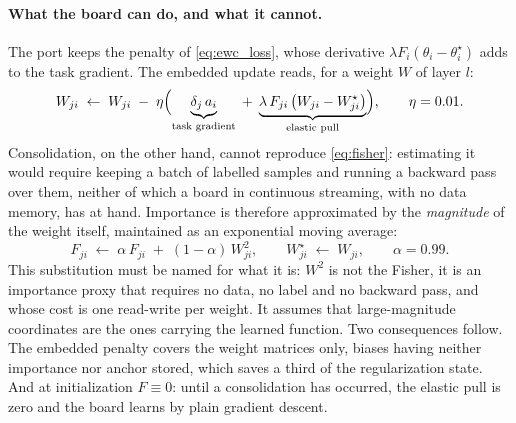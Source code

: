 \paragraph{What the board can do, and what it cannot.} The port keeps the penalty of
\eqref{eq:ewc_loss}, whose derivative $\lambda F_i (\theta_i - \theta^\star_i)$ adds to the task
gradient. The embedded update reads, for a weight $W$ of layer $l$:
\begin{equation}
\label{eq:board_sgd}
W_{ji} \;\leftarrow\; W_{ji} \;-\; \eta \Bigl(
\underbrace{\delta_j \, a_i}_{\text{task gradient}}
\;+\; \underbrace{\lambda \, F_{ji} \,\bigl(W_{ji} - W^\star_{ji}\bigr)}_{\text{elastic pull}}
\Bigr),
\qquad \eta = 0.01 .
\end{equation}
Consolidation, on the other hand, cannot reproduce \eqref{eq:fisher}: estimating it would require
keeping a batch of labelled samples and running a backward pass over them, neither of which a board
in continuous streaming, with no data memory, has at hand. Importance is therefore approximated by
the \emph{magnitude} of the weight itself, maintained as an exponential moving average:
\begin{equation}
\label{eq:board_fisher}
F_{ji} \;\leftarrow\; \alpha \, F_{ji} \;+\; (1-\alpha) \, W_{ji}^2 ,
\qquad
W^\star_{ji} \;\leftarrow\; W_{ji} ,
\qquad \alpha = \num{0.99} .
\end{equation}
This substitution must be named for what it is: $W^2$ is not the Fisher, it is an importance proxy
that requires no data, no label and no backward pass, and whose cost is one read-write per weight. It
assumes that large-magnitude coordinates are the ones carrying the learned function. Two consequences
follow. The embedded penalty covers the weight matrices only, biases having neither importance nor
anchor stored, which saves a third of the regularization state. And at initialization $F \equiv 0$:
until a consolidation has occurred, the elastic pull is zero and the board learns by plain gradient
descent.

